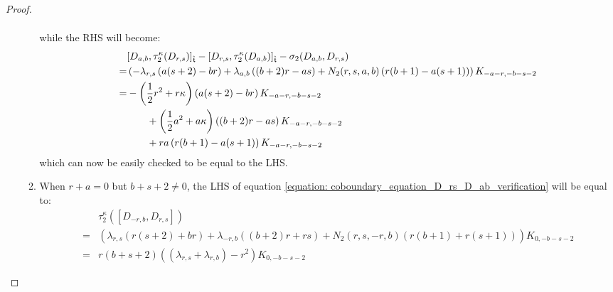 \begin{proof}
\begin{enumerate}
\begin{enumerate}
$$\begin{aligned}
                                \end{aligned}
                            $$
                        while the RHS will become:
                            $$
                                \begin{aligned}
                                    & [D_{a, b}, \tau_2^{\kappa}(D_{r, s})]_{\hat{\mathfrak{t}}} - [D_{r, s}, \tau_2^{\kappa}(D_{a, b})]_{\hat{\mathfrak{t}}} - \sigma_2(D_{a, b}, D_{r, s})
                                    \\
                                    = & \left( -\lambda_{r, s} \left( a(s + 2) - br \right) + \lambda_{a, b} \left( (b + 2) r - as \right) + N_2(r, s, a, b)\left( r(b + 1) - a(s + 1) \right) \right) K_{-a - r, -b - s - 2}
                                    \\
                                    = &
                                        -\left( \frac12 r^2 + r\kappa \right) \left( a(s + 2) - br \right) K_{-a - r, -b - s - 2}
                                        \\
                                        & \qquad + \left( \frac12 a^2 + a\kappa \right) \left( (b + 2) r - as \right) K_{-a - r, -b - s - 2} 
                                        \\
                                        & \qquad + ra\left( r(b + 1) - a(s + 1) \right) K_{-a - r, -b - s - 2}
                                \end{aligned}
                            $$
                        which can now be easily checked to be equal to the LHS.
                        \item When $r + a = 0$ but $b + s + 2 \not = 0$, the LHS of equation \eqref{equation: coboundary_equation_D_rs_D_ab_verification} will be equal to:
                            $$
                                \begin{aligned}
                                    & \tau_2^{\kappa}([D_{-r, b}, D_{r, s}])
                                    \\
                                    = & \left( \lambda_{r, s} \left( r(s + 2) + br \right) + \lambda_{-r, b} \left( (b + 2) r + rs \right) + N_2(r, s, -r, b)\left( r(b + 1) + r(s + 1) \right) \right) K_{0, -b - s - 2}
                                    \\
                                    = & r (b + s + 2) \left( (\lambda_{r, s} + \lambda_{r, b}) - r^2 \right) K_{0, -b - s - 2}
                                \end{aligned}
$$
\end{enumerate}
\end{enumerate}
\end{proof}
